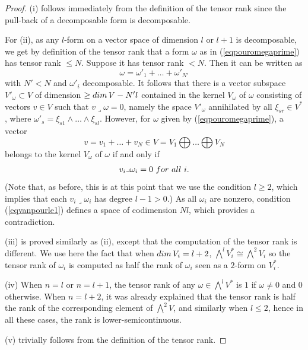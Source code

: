 \documentclass[10pt,a4paper]{amsart}
\begin{document}
\begin{proof} (i) follows immediately from the definition of the tensor rank since the pull-back of a decomposable form is decomposable.

For (ii), as any $l$-form on a vector space of dimension $l$ or $l+1$ is decomposable, we get by definition of the tensor rank that a form $\omega$ as in (\ref{eqpouromegaprime}) has tensor rank $\leq N$.  Suppose it has tensor rank $<N$. Then it can be written as
$$\omega=\omega'_1+\ldots+\omega'_{N'}$$
with $N'<N$ and $\omega'_i$ decomposable. It follows that there is a vector subspace $V'_\omega\subset V$ of dimension $\geq {\rm dim}\,V-N'l$ contained in the kernel $V_\omega$ of $\omega$ consisting of vectors $v\in V$ such that $v\lrcorner\omega=0$, namely the space  $V'_\omega$  annihilated by all $\xi_{sr}\in V^*$, where
$\omega'_{s}=\xi_{s1}\wedge\ldots\wedge \xi_{sl}$.
However, for $\omega$ given by (\ref{eqpouromegaprime}), a vector $$v=v_1+\ldots+ v_N\in V=V_1\bigoplus \ldots\bigoplus V_N$$ belongs to the kernel  $V_\omega$ of $\omega$ if and only if \begin{eqnarray}\label{eqvanpourle1}v_i\lrcorner\omega_i=0\,\,{\rm  for\,\, all}\,\, i. \end{eqnarray}
(Note that, as before, this is at this point that we use the condition $l\geq 2$, which implies that each $v_i\lrcorner\omega_i$ has degree $l-1>0$.)
As all $\omega_i$ are nonzero, condition (\ref{eqvanpourle1}) defines a space of codimension $Nl$, which provides  a contradiction.

(iii) is proved similarly as (ii), except that the computation of the tensor rank is different. We use here the fact that when ${\rm dim}\,V_i=l+2$, $\bigwedge^lV_i^*\cong \bigwedge^2V_i$ so the tensor rank of $\omega_i$ is computed as half the rank of $\omega_i$ seen as a $2$-form on $V_i^*$.

(iv) When $n=l$ or $n=l+1$, the tensor rank of any $\omega\in \bigwedge^lV^*$ is $1$ if $\omega\not=0$ and $0$ otherwise. When $n=l+2$, it was already explained  that the tensor rank is half the rank of the corresponding element of $\bigwedge^2V$, and similarly when $l\leq 2$, hence in all these cases, the rank  is lower-semicontinuous.

(v) trivially follows from the definition of the tensor rank.
\end{proof}
\end{document}
